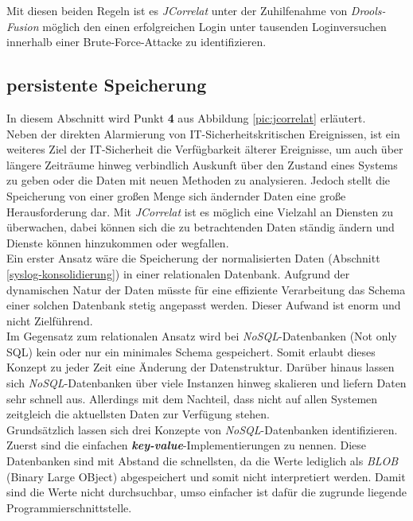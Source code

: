 Mit diesen beiden Regeln ist es \textit{JCorrelat} unter der Zuhilfenahme von 
\textit{Drools-Fusion} möglich den einen erfolgreichen Login unter tausenden 
Loginversuchen innerhalb einer Brute-Force-Attacke zu identifizieren.

\subsection{persistente Speicherung}\label{nosql}

In diesem Abschnitt wird Punkt \textbf{4} aus Abbildung \ref{pic:jcorrelat} erläutert.\\

Neben der direkten Alarmierung von IT-Sicherheitskritischen Ereignissen, ist ein weiteres 
Ziel der IT-Sicherheit die Verfügbarkeit älterer Ereignisse, um auch über längere 
Zeiträume hinweg verbindlich Auskunft über den Zustand eines Systems zu geben oder die 
Daten mit neuen Methoden zu analysieren. Jedoch stellt die Speicherung von einer großen 
Menge sich ändernder Daten eine große Herausforderung dar. Mit \textit{JCorrelat} ist es 
möglich eine Vielzahl an Diensten zu überwachen, dabei können sich die zu betrachtenden 
Daten ständig ändern und Dienste können hinzukommen oder wegfallen.\\

Ein erster Ansatz wäre die Speicherung der normalisierten Daten (Abschnitt 
\ref{syslog-konsolidierung}) in einer relationalen Datenbank. Aufgrund der dynamischen 
Natur der Daten müsste für eine effiziente Verarbeitung das Schema einer solchen 
Datenbank stetig angepasst werden. Dieser Aufwand ist enorm und nicht Zielführend.\\
Im Gegensatz zum relationalen Ansatz wird bei \textit{NoSQL}-Datenbanken (Not only SQL) 
kein oder nur ein minimales Schema gespeichert. Somit erlaubt dieses Konzept zu jeder 
Zeit eine Änderung der Datenstruktur. Darüber hinaus lassen sich 
\textit{NoSQL}-Datenbanken über viele Instanzen hinweg skalieren und liefern Daten sehr 
schnell aus. Allerdings mit dem Nachteil, dass nicht auf allen Systemen zeitgleich die 
aktuellsten Daten zur Verfügung stehen.\\

Grundsätzlich lassen sich drei Konzepte von \textit{NoSQL}-Datenbanken identifizieren. 
Zuerst sind die einfachen \textbf{\emph{key-value}}-Implementierungen zu nennen. Diese 
Datenbanken sind mit Abstand die schnellsten, da die Werte lediglich als \textit{BLOB} 
(Binary Large OBject) abgespeichert und somit nicht interpretiert werden. Damit 
sind die Werte nicht durchsuchbar, umso einfacher ist dafür die zugrunde liegende 
Programmierschnittstelle.\\


